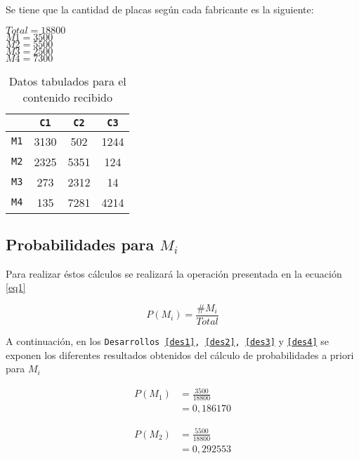 \documentclass{article}
\begin{document}
Se tiene que la cantidad de placas seg\'un cada fabricante es la siguiente:
\begin{center}
$Total=18800$\\
$M1 = 3500$\\
$M2 = 5500$\\
$M3 = 2500$\\
$M4 = 7300$\\
\end{center}

\begin{table}[ht]
\caption{Datos tabulados para el contenido recibido}
\centering
\begin{tabular}{c | c c c }
\hline
		& \texttt{C1} & \texttt{C2} & \texttt{C3} \\ \hline
\texttt{M1} 	&     3130   &      502    &     1244     \\
\texttt{M2} 	&     2325   &      5351    &     124     \\
\texttt{M3} 	&     273   &      2312    &     14     \\
\texttt{M4} 	&     135   &      7281    &     4214  \\ \hline
\end{tabular}
\label{tab:datoscontenido}
\end{table}

\subsection*{Probabilidades para $M_{i}$}
Para realizar \'estos c\'alculos se realizar\'a la operaci\'on presentada en
la ecuaci\'on \ref{eq1}

\begin{equation} \label{eq1}
	P(M_{i}) = \frac{\#M_{i}}{Total}
\end{equation}

A continuaci\'on, en los \texttt{Desarrollos \ref{des1}, \ref{des2}, \ref{des3}} y
\texttt{\ref{des4}} se exponen los diferentes resultados obtenidos del c\'alculo
de probabilidades a priori para $M_{i}$

\begin{equation} \label{des1}
\begin{split}
 P(M_{1}) & =  \frac{3500}{18800} \\
 & = 0,186170
\end{split}
\end{equation}

\begin{equation} \label{des2}
\begin{split}
 P(M_{2}) & =  \frac{5500}{18800} \\
 & = 0,292553
\end{split}
\end{equation}
\end{document}
